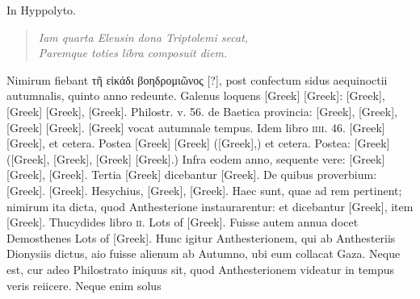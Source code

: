 In Hyppolyto.
\begin{quote}
  \emph{Iam quarta Eleusin dona Triptolemi secat,\\
  Paremque toties libra composuit diem.}
\end{quote}

Nimirum fiebant \textgreek{τῆ εἰκάδι βοηδρομιῶνος [?]},
 post confectum sidus aequinoctii
autumnalis, quinto anno redeunte.
Galenus loquens \textgreek{[Greek]}
\textgreek{[Greek]}: \textgreek{[Greek]},
 \textgreek{[Greek]}
\textgreek{[Greek]}, \textgreek{[Greek]}.
Philostr. v. 56. de
Baetica provincia: \textgreek{[Greek]}, \textgreek{[Greek]},
 \textgreek{[Greek]}
\textgreek{[Greek]}.
\textgreek{[Greek]} vocat autumnale tempus.
Idem libro \textsc{iiii}. 46. \textgreek{[Greek]}
\textgreek{[Greek]}, et cetera.
Postea \textgreek{[Greek]}
\textgreek{[Greek]} (\textgreek{[Greek]},) et cetera.
Postea:
\textgreek{[Greek]} (\textgreek{[Greek]}, \textgreek{[Greek]},
 \textgreek{[Greek]}
\textgreek{[Greek]}.)
Infra eodem anno, sequente vere: \textgreek{[Greek]}
\textgreek{[Greek]}, \textgreek{[Greek]}.
Tertia
\textgreek{[Greek]} dicebantur \textgreek{[Greek]}.
De quibus proverbium: \textgreek{[Greek]}.
\textgreek{[Greek]}.
Hesychius, \textgreek{[Greek]}, \textgreek{[Greek]}.
Haec sunt, quae ad rem
pertinent; nimirum ita dicta, quod Anthesterione instaurarentur: et
dicebantur \textgreek{[Greek]}, item \textgreek{[Greek]}.
Thucydides
libro \textsc{ii}.
\textgreek{Lots of [Greek]}.
Fuisse autem annua docet Demosthenes
\textgreek{Lots of [Greek]}.
Hunc igitur Anthesterionem, qui ab
Anthesteriis Dionysiis dictus, aio fuisse alienum ab Autumno, ubi
eum collacat Gaza.
Neque est, cur adeo Philostrato iniquus sit, quod
Anthesterionem videatur in tempus veris reiicere.
Neque enim solus
